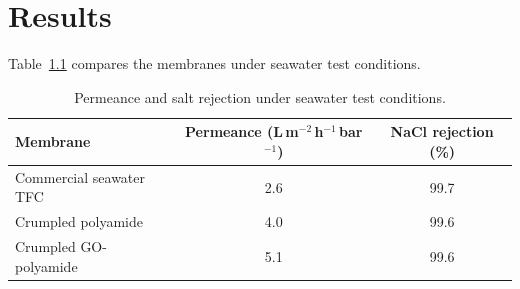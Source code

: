 \chapter{Results}
\label{ch:results}

Table~\ref{tab:perf} compares the membranes under seawater test conditions.

\begin{table}[htbp]
  \centering
  \caption{Permeance and salt rejection under seawater test conditions.}
  \label{tab:perf}
  \begin{tabular}{lcc}
    \toprule
    Membrane & Permeance (L\,m$^{-2}$\,h$^{-1}$\,bar$^{-1}$) & NaCl rejection (\%) \\
    \midrule
    Commercial seawater TFC   & 2.6 & 99.7 \\
    Crumpled polyamide        & 4.0 & 99.6 \\
    Crumpled GO-polyamide     & 5.1 & 99.6 \\
    \bottomrule
  \end{tabular}
\end{table}
